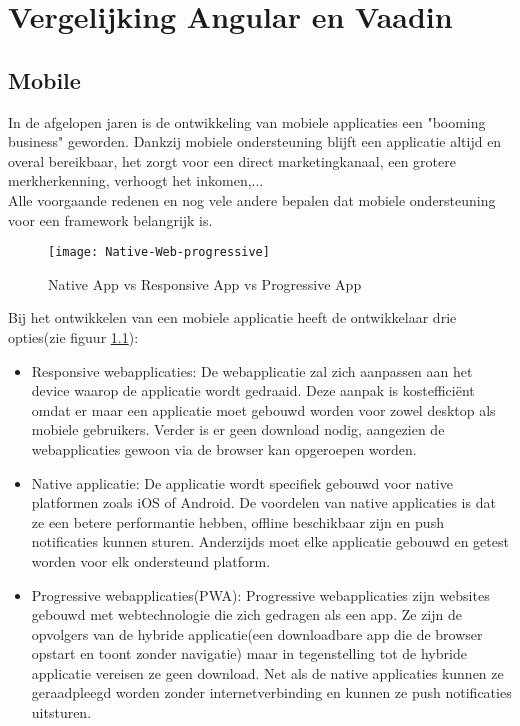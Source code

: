 \chapter{Vergelijking Angular en Vaadin}
\label{ch:angular}
\section{Mobile}
In de afgelopen jaren is de ontwikkeling van mobiele applicaties een "booming business" geworden. Dankzij mobiele ondersteuning blijft een applicatie altijd en overal bereikbaar, het zorgt voor een direct marketingkanaal, een grotere merkherkenning, verhoogt het inkomen,... \\
 Alle voorgaande redenen en nog vele andere bepalen dat mobiele ondersteuning voor een framework belangrijk is.

\begin{figure}[H]
	\centering
	\texttt{[image: Native-Web-progressive]}
	\caption{Native App vs Responsive App vs Progressive App \autocite{Solis2018}}
	\label{fig:native-responsive-web}
\end{figure}
Bij het ontwikkelen van een mobiele applicatie heeft de ontwikkelaar drie opties(zie figuur \ref{fig:native-responsive-web}):
\begin{itemize}
	\item Responsive webapplicaties: De webapplicatie zal zich aanpassen aan het device waarop de applicatie wordt gedraaid. Deze aanpak is kostefficiënt omdat er maar een applicatie moet gebouwd worden voor zowel desktop als mobiele gebruikers. Verder is er geen download nodig, aangezien de webapplicaties gewoon via de browser kan opgeroepen worden.
	\item Native applicatie: De applicatie wordt specifiek gebouwd voor native platformen zoals iOS of Android. De voordelen van native applicaties is dat ze een betere performantie hebben, offline beschikbaar zijn en push notificaties kunnen sturen. Anderzijds moet elke applicatie gebouwd en getest worden voor elk ondersteund platform.
	\item Progressive webapplicaties(PWA):  Progressive webapplicaties zijn websites gebouwd met webtechnologie die zich gedragen als een app. Ze zijn de opvolgers van de hybride applicatie(een downloadbare app die de browser opstart en toont zonder navigatie) maar in tegenstelling tot de hybride applicatie vereisen ze geen download. Net als de native applicaties kunnen ze geraadpleegd worden zonder internetverbinding en kunnen ze push notificaties uitsturen. 
\end{itemize}

